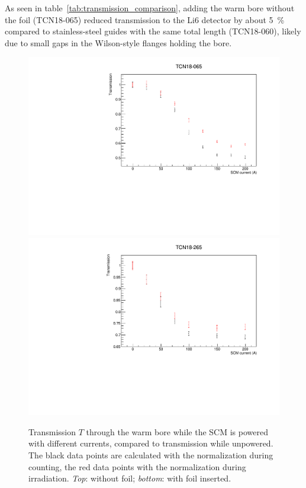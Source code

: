 \documentclass[10pt,letterpaper]{article}
\begin{document}
As seen in table~\ref{tab:transmission_comparison}, adding the warm bore without the foil (TCN18-065) reduced transmission to the Li6 detector by about \SI{5}{\percent} compared to stainless-steel guides with the same total length (TCN18-060), likely due to small gaps in the Wilson-style flanges holding the bore.

\begin{figure}
\centering
\includegraphics[width=\textwidth,page=1]{../transmission/TCN18-065.pdf}
\includegraphics[width=\textwidth,page=1]{../transmission/TCN18-265.pdf}
\caption{Transmission $T$ through the warm bore while the SCM is powered with different currents, compared to transmission while unpowered. The black data points are calculated with the normalization during counting, the red data points with the normalization during irradiation. \textit{Top}: without foil; \textit{bottom}: with foil inserted.}
\label{fig:SCMtransmission}
\end{figure}
\end{document}
